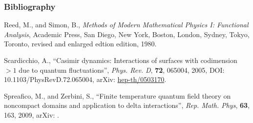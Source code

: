 \documentclass[10pt,t]{beamer}  %
\begin{document}
\begin{frame}
  \frametitle{Bibliography}


  \begin{thebibliography}{99}
   Reed,
    M., and Simon, B., \emph{Methods of Modern Mathematical Physics I:
      Functional Analysis}, Academic Press, San Diego, New York,
    Boston, London, Sydney, Tokyo, Toronto, revised and enlarged
    edtion edition, 1980.

   Scardicchio, A., ``Casimir
    dynamics: Interactions of surfaces with codimension $> 1$ due to
    quantum fluctuations'', \emph{Phys. Rev. D}, \textbf{72}, 065004,
    2005, DOI: 10.1103/PhysRevD.72.065004, arXiv:
    \href{https://arxiv.org/abs/hep-th/0503170}{hep-th/0503170}.

    Spreafico, M., and Zerbini, S., ``Finite temperature quantum field
    theory on noncompact domains and application to delta
    interactions'', \emph{Rep. Math. Phys}, \textbf{63}, 163, 2009,
    arXiv: .

  \end{thebibliography}

\end{frame}


















































 {}



\end{document}
